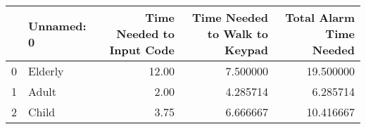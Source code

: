 \begin{tabular}{llrrr}
\toprule
{} & Unnamed: 0 &  Time Needed to Input Code &  Time Needed to Walk to Keypad &  Total Alarm Time Needed \\
\midrule
0 &    Elderly &                      12.00 &                       7.500000 &                19.500000 \\
1 &      Adult &                       2.00 &                       4.285714 &                 6.285714 \\
2 &      Child &                       3.75 &                       6.666667 &                10.416667 \\
\bottomrule
\end{tabular}

